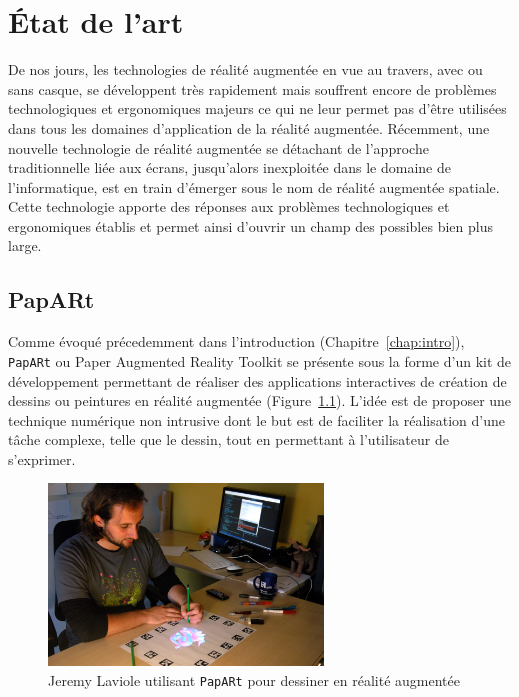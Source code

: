 \chapter{État de l'art}

De nos jours, les technologies de réalité augmentée en vue au travers, avec ou sans casque, se développent très rapidement mais souffrent encore de problèmes technologiques et ergonomiques majeurs ce qui ne leur permet pas d'être utilisées dans tous les domaines d'application de la réalité augmentée\cite{li2017state}. 
Récemment, une nouvelle technologie de réalité augmentée se détachant de l'approche traditionnelle liée aux écrans, jusqu'alors inexploitée dans le domaine de l'informatique, est en train d'émerger sous le nom de réalité augmentée spatiale. Cette technologie apporte des réponses aux problèmes technologiques et ergonomiques établis et permet ainsi d'ouvrir un champ des possibles bien plus large\cite{bimber2006modern}.

\section{PapARt}
\label{sec:papart}
Comme évoqué précedemment dans l'introduction (Chapitre~\ref{chap:intro}), \texttt{PapARt} ou Paper Augmented Reality Toolkit se présente sous la forme d'un kit de développement permettant de réaliser des applications interactives de création de dessins ou peintures en réalité augmentée (Figure~\ref{fig:papartdemo}). L'idée est de proposer une technique numérique non intrusive dont le but est de faciliter la réalisation d'une tâche complexe, telle que le dessin, tout en permettant à l'utilisateur de s'exprimer\cite{laviole2012papart}.

\begin{figure}[H]
\centering
\includegraphics[width=0.65\textwidth]{images/papart-demo}
\caption{Jeremy Laviole utilisant \texttt{PapARt} pour dessiner en réalité augmentée\protect\footnotemark}
\label{fig:papartdemo}
\end{figure}


